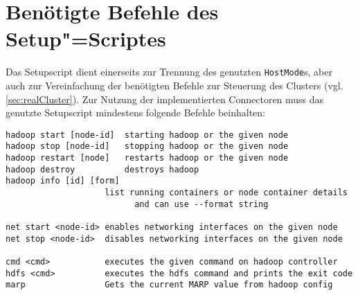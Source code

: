 \chapter{Benötigte Befehle des Setup"=Scriptes}
\label{app:setupScriptCmds}

Das Setupscript dient einerseits zur Trennung des genutzten \texttt{HostMode}s, aber auch zur Vereinfachung der benötigten Befehle zur Steuerung des Clusters (vgl. \cref{sec:realCluster}).
Zur Nutzung der implementierten Connectoren muss das genutzte Setupscript mindestens folgende Befehle beinhalten:

\begin{lstlisting}[label=lst:setupscriptHelp,style=plain,
caption={[Benötigte Befehle eines Setupscriptes]
    Benötigte Befehle eines Setupscriptes.
    Das Setupscript des \mbox{\texttt{Multihost}}"=Modes bietet zum Teil andere Befehle an, besitzt jedoch entsprechende Befehle zur vollständigen Kompatibilität.}]
hadoop start [node-id]  starting hadoop or the given node
hadoop stop [node-id]   stopping hadoop or the given node
hadoop restart [node]   restarts hadoop or the given node
hadoop destroy          destroys hadoop
hadoop info [id] [form]
                    list running containers or node container details
                          and can use --format string

net start <node-id> enables networking interfaces on the given node
net stop <node-id>  disables networking interfaces on the given node

cmd <cmd>           executes the given command on hadoop controller
hdfs <cmd>          executes the hdfs command and prints the exit code
marp                Gets the current MARP value from hadoop config
\end{lstlisting}

